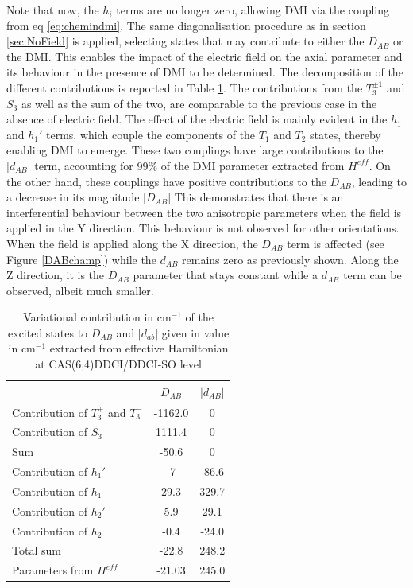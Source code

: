 \documentclass[12pt]{report}
\numberwithin{equation}{section}
\begin{document}
Note that now, the $h_i$ terms are no longer zero, allowing DMI via the coupling from eq \ref{eq:chemindmi}.
The same diagonalisation procedure as in section \ref{sec:NoField} is applied, selecting states that may contribute to either the $D_{AB}$ or the DMI.
This enables the impact of the electric field on the axial parameter and its behaviour in the presence of DMI to be determined.
The decomposition of the different contributions is reported in Table \ref{tab:decompfield}.
The contributions from the $T_3^{\pm1}$ and $S_3$ as well as the sum of the two, are comparable to the previous case in the absence of electric field.
The effect of the electric field is mainly evident in the $h_1$ and $h_1'$ terms, which couple the components of the $T_1$ and $T_2$ states, thereby enabling DMI to emerge.
These two couplings have large contributions to the $|d_{AB}|$ term, accounting for 99\% of the DMI parameter extracted from $H^{eff}$.
On the other hand, these couplings have positive contributions to the $D_{AB}$, leading to a decrease in its magnitude $|D_{AB}|$
This demonstrates that there is an interferential behaviour between the two anisotropic parameters when the field is applied in the Y direction.
This behaviour is not observed for other orientations. 
When the field is applied along the X direction, the $D_{AB}$ term is affected (see Figure \ref{DABchamp}) while the $d_{AB}$ remains zero as previously shown.
Along the Z direction, it is the $D_{AB}$ parameter that stays constant while a $d_{AB}$ term can be observed, albeit much smaller.

\begin{table}
    \centering
    \begin{tabular}{l c c}
        \hline
        \hline
         & $D_{AB}$ & $|d_{AB}|$\\
         \hline
         Contribution of $T_3^+$ and $T_3^-$& -1162.0& 0 \\
         Contribution of $S_3$& 1111.4 & 0\\
         Sum & -50.6 &0\\
         Contribution of $h_1'$ & -7 & -86.6\\
         Contribution of $h_1$& 29.3 & 329.7\\
         Contribution of $h_2'$& 5.9 & 29.1\\
         Contribution of $h_2$ & -0.4 & -24.0\\
         Total sum & -22.8  & 248.2\\
         Parameters from $H^{eff}$ & -21.03 & 245.0\\
         \hline
         \hline
    \end{tabular}
    \caption{Variational contribution in cm$^{-1}$ of the excited states to $D_{AB}$ and $|d_{ab}|$ given in value in cm$^{-1}$ extracted from effective Hamiltonian at CAS(6,4)DDCI/DDCI-SO level}
    \label{tab:decompfield}
\end{table}
\end{document}
